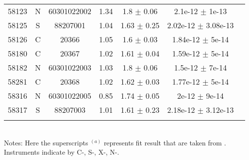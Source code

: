 \begin{table}
\begin{tabular}{lcccccc}
58123 & N & 60301022002 & 1.34 & 1.8 $\pm$ 0.06 & 2.1e-12 $\pm$ 1e-13 \\ 
58125 & S & 88207001 & 1.04 & 1.63 $\pm$ 0.25 & 2.02e-12 $\pm$ 3.08e-13 \\ 
58126 & C & 20366 & 1.05 & 1.6 $\pm$ 0.03 & 1.84e-12 $\pm$ 5e-14 \\ 
58180 & C & 20367 & 1.02 & 1.61 $\pm$ 0.04 & 1.59e-12 $\pm$ 5e-14 \\ 
58182 & N & 60301022003 & 1.03 & 1.8 $\pm$ 0.06 & 1.5e-12 $\pm$ 7e-14 \\ 
58281 & C & 20368 & 1.02 & 1.62 $\pm$ 0.03 & 1.77e-12 $\pm$ 5e-14 \\ 
58316 & N & 60301022005 & 0.85 & 1.74 $\pm$ 0.05 & 2e-12 $\pm$ 9e-14 \\ 
58317 & S & 88207003 & 1.01 & 1.61 $\pm$ 0.23 & 2.18e-12 $\pm$ 3.12e-13 \\  \\ \hline
\end{tabular}\\
Notes: Here the superscripts $^{(a)}$ represents fit result that are taken from \citet{2017A&A...607L...9K}. Instruments indicate by C-\chandra, S-\swift, X-\xmm, N-\nustar. 
\end{table}